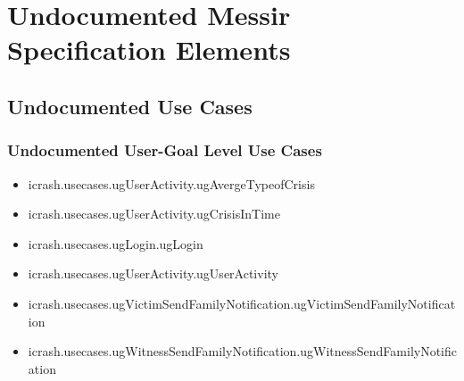 	
\chapter{Undocumented Messir Specification Elements}


\section[Undocumented Use Cases]{Undocumented Use Cases}


\subsection[Undocumented Use Cases - User-Goal Level]{Undocumented User-Goal Level Use Cases}
\begin{itemize}
\item icrash.usecases.ugUserActivity.ugAvergeTypeofCrisis 
\item icrash.usecases.ugUserActivity.ugCrisisInTime 
\item icrash.usecases.ugLogin.ugLogin 
\item icrash.usecases.ugUserActivity.ugUserActivity 
\item icrash.usecases.ugVictimSendFamilyNotification.ugVictimSendFamilyNotification 
\item icrash.usecases.ugWitnessSendFamilyNotification.ugWitnessSendFamilyNotification 
\end{itemize}

